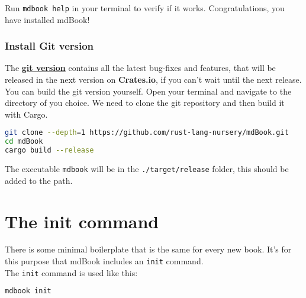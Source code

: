 \documentclass{article}
\begin{document}
Run \lstinline|mdbook help| in your terminal to verify if it works. Congratulations, you
have installed mdBook!\\

\subsubsection{Install Git version}
\label{Install Git version}
\label{install-git-version}

The \textbf{\href{https://github.com/rust-lang-nursery/mdBook}{git version}} contains all
the latest bug-fixes and features, that will be released in the next version on
\textbf{Crates.io}, if you can't wait until the next release. You can build the git
version yourself. Open your terminal and navigate to the directory of you
choice. We need to clone the git repository and then build it with Cargo.\\
\begin{lstlisting}[language=bash]
git clone --depth=1 https://github.com/rust-lang-nursery/mdBook.git
cd mdBook
cargo build --release

\end{lstlisting}

The executable \lstinline|mdbook| will be in the \lstinline|./target/release| folder, this should be
added to the path.\\

\section{The init command}
\label{The init command}
\label{the-init-command}

There is some minimal boilerplate that is the same for every new book. It's for
this purpose that mdBook includes an \lstinline|init| command.\\

The \lstinline|init| command is used like this:\\
\begin{lstlisting}[language=bash]
mdbook init

\end{lstlisting}
\end{document}
